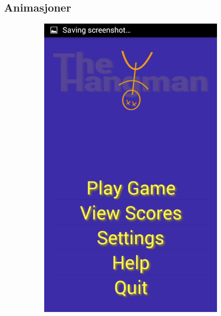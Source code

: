 \subsection{Animasjoner}

\begin{figure}[ht]
    \centering
   \begin{subfigure}[b]{0.25\textwidth}
        \includegraphics[width=\textwidth]{./img/gui/a1.png}
    \end{subfigure}
    \begin{subfigure}[b]{0.25\textwidth}

\end{subfigure}
\end{figure}
